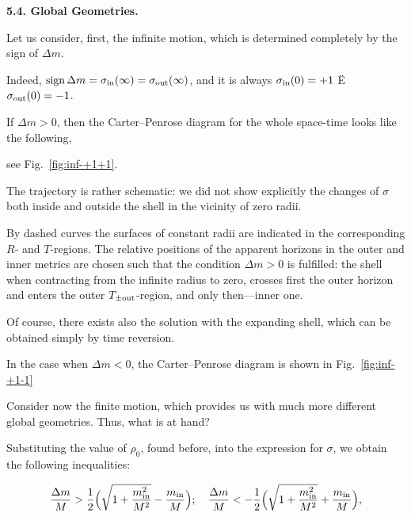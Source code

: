 \smallskip



\textbf{5.4. Global Geometries.}

Let us consider, first, the infinite motion, which is determined completely by the sign of $\Delta m$. 

Indeed, $\mathop{\rm sign} \Delta m = \sigma_{\rm in}(\infty) = \sigma_{\rm out}(\infty)$, and it is always $\sigma_{\rm in}(0) = + 1$ Ë $\sigma_{\rm out}(0) = - 1$. 

If $\Delta m > 0$, then the Carter--Penrose diagram for the whole space-time looks like the following,

see Fig.~\ref{fig:inf-+1+1}.

The trajectory is rather schematic: we did not show explicitly the changes of $\sigma$ both inside and outside the shell in the vicinity of zero radii. 

By dashed curves the surfaces of constant radii are indicated in the corresponding $R$- and $T$-regions. The relative positions of the apparent horizons in the outer and inner metrics are chosen such that the condition $\Delta m > 0$ is fulfilled: the shell when contracting from the infinite radius to zero, crosses first the outer horizon and enters the outer $T_{\pm {\rm out}}$-region, and only then---inner one. 

Of course, there exists also the solution with the expanding shell, which can be obtained simply by time reversion.

In the case when $\Delta m < 0$, the Carter--Penrose diagram is shown in Fig.~\ref{fig:inf-+1-1}





Consider now the finite motion, which provides us with much more different global geometries. Thus, what is at hand?  

Substituting the value of $\rho_0$, found before, into the expression for $\sigma$, we obtain the following inequalities:

\begin{equation}

\label{sig1}

\frac{\Delta m}{M} > \frac{1}{2} \Bigl( \sqrt{1 + \frac{m_{\rm in}^2}{M^2}} - \frac{m_{\rm in}}{M} \Bigr) ; \quad 

\frac{\Delta m}{M} < - \frac{1}{2} \Bigl( \sqrt{1 + \frac{m_{\rm in}^2}{M^2}} + \frac{m_{\rm in}}{M} \Bigr),

\end{equation}

